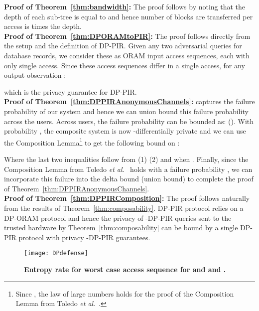 \documentclass[USenglish,oneside,twocolumn]{article}
\newcommand{\etal}{\textit{et al}.}
\begin{document}
\textbf{Proof of Theorem~\ref{thm:bandwidth}: }The proof follows by noting that the depth of each sub-tree is equal to  and hence number of blocks are transferred per access is  times the depth. \\


\textbf{Proof of Theorem~\ref{thm:DPORAMtoPIR}: }The proof follows directly from the setup and the definition of DP-PIR. Given any two adversarial queries  for database records, we consider these as ORAM input access sequences, each with only single access. Since these access sequences differ in a single access, for any output observation :

which is the privacy guarantee for DP-PIR. \\

\textbf{Proof of Theorem~\ref{thm:DPPIRAnonymousChannels}: } captures the failure probability of our system and hence we can union bound this failure probability across the  users. Across  users, the failure probability  can be bounded as:  (). With probability , the composite system is now -differentially private and we can use the Composition Lemma\footnote{Since , the law of large numbers holds for the proof of the Composition Lemma from Toledo \etal~\cite{goldbergDPPIR}.} to get the following bound on :



Where the last two inequalities follow from (1)  (2)  and  when . Finally, since the Composition Lemma from Toledo \etal~\cite{goldbergDPPIR} holds with a failure probability , we can incorporate this failure into the delta bound (union bound) to complete the proof of Theorem~\ref{thm:DPPIRAnonymousChannels}. \\




\textbf{Proof of Theorem~\ref{thm:DPPIRComposition}: }The proof follows naturally from the results of Theorem~\ref{thm:composability}. DP-PIR protocol relies on a DP-ORAM protocol and hence the privacy of  -DP-PIR queries sent to the trusted hardware by Theorem~\ref{thm:composability} can be bound by a single DP-PIR protocol with privacy -DP-PIR guarantees. 



\begin{figure}[!tp]
\centering
\texttt{[image: DPdefense]}
\vspace{-5pt}
\caption{\textbf{Entropy rate for worst case access sequence for  and  and .}}
\label{fig:entropyrate}
\end{figure}
\end{document}

